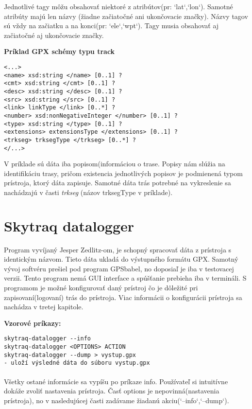 Jednotlivé tagy môžu obsahovať niektoré z atribútov(pr: `lat`,`lon`). Samotné atribúty majú len názvy (žiadne začiatočné ani ukončovacie značky). Názvy tagov sú vždy na začiatku a na konci(pr: `ele`,`wpt`). Tagy musia obsahovať aj začiatočné aj ukončovacie značky.


\begin{center}
\textbf{Príklad GPX schémy typu track}
\begin{verbatim}
<...>
<name> xsd:string </name> [0..1] ?
<cmt> xsd:string </cmt> [0..1] ?
<desc> xsd:string </desc> [0..1] ?
<src> xsd:string </src> [0..1] ?
<link> linkType </link> [0..*] ?
<number> xsd:nonNegativeInteger </number> [0..1] ?
<type> xsd:string </type> [0..1] ?
<extensions> extensionsType </extensions> [0..1] ?
<trkseg> trksegType </trkseg> [0..*] ?
</...>
\end{verbatim}
\end{center}

V príklade sú dáta iba popisom(informáciou o trase. Popisy nám slúžia na identifikáciu trasy, pričom existencia jednotlivých  popisov je podmienená typom prístroja, ktorý dáta zapisuje. Samotné dáta trás potrebné na vykreslenie sa nachádzajú v časti \textit{trkseg} (názov trksegType v príklade).

\section{Skytraq datalogger}
\paragraph{}Program vyvíjaný Jesper Zedlitz-om, je schopný spracovať dáta z
prístroja s identickým názvom. Tieto dáta ukladá do výstupného formátu GPX.
Samotný vývoj softvéru prešiel pod program GPSbabel, no doposiaľ je iba v testovacej verzii. Tento program nemá GUI interface a spúšťanie prebieha iba v termináli. S programom je možné konfigurovať daný prístroj čo je dôležité pri zapisovaní(logovaní) trás do prístroja. Viac informácii o konfigurácii prístroja sa nachádza v tretej kapitole.
\begin{center}
 \textbf{Vzorové príkazy:}
\begin{verbatim}
skytraq-datalogger --info
skytraq-datalogger <OPTIONS> ACTION
skytraq-datalogger --dump > vystup.gpx 
- uloží výsledné dáta do súboru vystup.gpx
\end{verbatim}
\end{center}
\paragraph{}Všetky ostané informácie sa vypíšu po príkaze info. Používateľ si intuitívne dokáže zvoliť nastavenia prístroja.
Časť options je nepovinná(nastavenia prístroja), no v nasledujúcej časti zadávame žiadanú akciu(`--info`,`--dump`).

